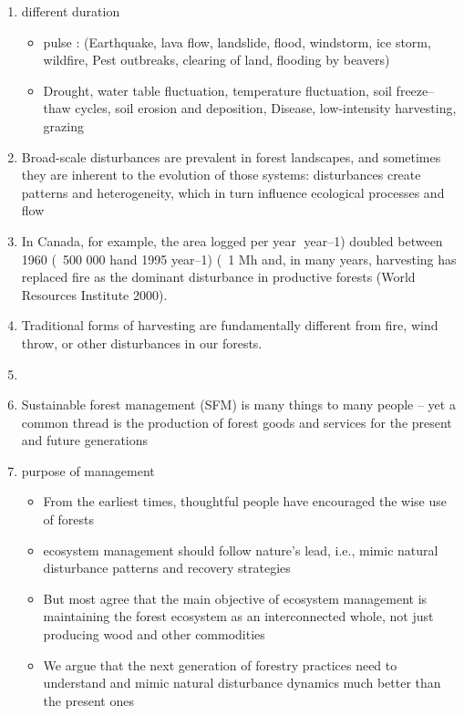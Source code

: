 \documentclass{article}
\begin{document}
\begin{enumerate}
\begin{itemize}
        \end{itemize}
    \item different duration \cite{perera2015simulation}
    \begin{itemize}
        \item pulse : (Earthquake, lava flow, landslide, flood, windstorm, ice storm, wildfire, Pest outbreaks, clearing of land, flooding by beavers)
        \item Drought, water table fluctuation, temperature fluctuation, soil freeze–thaw cycles, soil erosion and deposition, Disease, low-intensity harvesting, grazing
    \end{itemize}
    \item Broad-scale disturbances are prevalent in forest landscapes, and sometimes they are inherent to the evolution of those systems: disturbances create patterns and heterogeneity, which in turn influence ecological processes and flow \cite{turner2010disturbance}
    \item In Canada, for example, the area logged per year year–1) doubled between 1960 (~500 000 hand 1995 year–1) (~1 Mh and, in many years, harvesting has replaced fire as the dominant disturbance in productive forests (World Resources Institute 2000). \cite{smith_canadas_2000}
    \item Traditional forms of harvesting are fundamentally different from fire, wind throw, or other disturbances in our forests.
    \item
    \item Sustainable forest management (SFM) is many things to many people – yet a common thread is the production of forest goods and services for the present and future generations \cite{macdicken2015global}
    \item purpose of management
    \begin{itemize}
        \item From the earliest times, thoughtful people have encouraged the wise use of forests \cite{macdicken2015global}
        \item ecosystem management should follow nature's lead, i.e., mimic natural disturbance patterns and recovery strategies \cite{bengston_changing_1994}
        \item But most agree that the main objective of ecosystem management is maintaining the forest ecosystem as an interconnected whole, not just producing wood and other commodities \cite{franklin1989toward}
        \item We argue that the next generation of forestry practices need to understand and mimic natural disturbance dynamics much better than the present ones \cite{bengtsson2000biodiversity} 

\end{itemize}
\end{enumerate}
\end{document}
